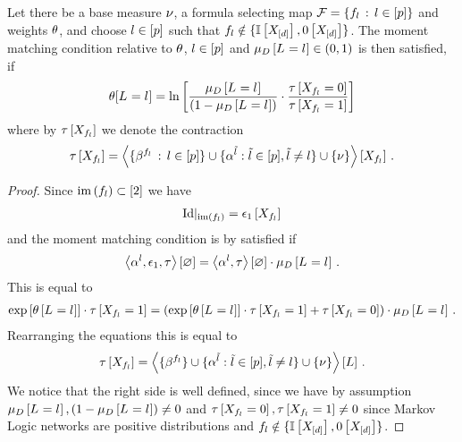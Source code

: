 \begin{lemma}\label{ref:lemMMinMLN}
	Let there be a base measure $\nu$, a formula selecting map $\mathcal{F}=\{f_{l} \, : \, l\in[p]\}$ and weights $\theta$, and choose $l\in[p]$ such that $f_{l}  \notin \{\mathbb{I}\left[X_{[d]}\right],0\left[X_{[d]}\right]\}$.
	The moment matching condition relative to $\theta$, $l\in[p]$ and $\mu_{D}\left[L_{}=l_{}\right]\in(0,1)$ is then satisfied, if
	\begin{align} \label{sol:momentMatchingExformula}
	 	\theta[L_{}=l_{}] = \ln \left[ 
		\frac{\mu_{D}\left[L_{}=l_{}\right]}{(1-\mu_{D}\left[L_{}=l_{}\right])}
		\cdot \frac{\tau\left[X_{f_{l} }=0\right]}{\tau\left[X_{f_{l} }=1\right]}
		 \right]
	\end{align}
	where by $\tau\left[X_{f_{l} }\right]$ we denote the contraction
	\begin{align*}
	 	\tau\left[X_{f_{l}}\right]
		= \left\langle \{\beta^{f_{l}} \, : \, l\in[p]\}
		\cup\{\alpha^{\tilde{l}} : \tilde{l} \in [p], \tilde{l}\neq l\}
		\cup\{\nu\}\right\rangle \left[ X_{f_{l}} \right] \, .
	\end{align*}
\end{lemma}
\begin{proof}
	Since $\mathrm{im}\left(f_{l}\right)\subset[2]$ we have
	\begin{align*}
		{\mathrm{Id}}|_{\mathrm{im}\left(f_{l}\right)} = \epsilon_{1}\left[X_{f_{l}}\right]
	\end{align*}
	and the moment matching condition is by  satisfied if
	\begin{align*}
		\left\langle \alpha^{l}, \epsilon_{1}, \tau\right\rangle \left[ \varnothing \right]
			= \left\langle \alpha^{l},\tau\right\rangle \left[ \varnothing \right] \cdot \mu_{D}\left[L_{}=l_{}\right] \, .
	\end{align*}
	This is equal to
	\begin{align*}
		\mathrm{exp}\left[\theta\left[L_{}=l_{}\right]\right] \cdot \tau\left[X_{f_{l}}=1\right]
		= \left( \mathrm{exp}\left[\theta\left[L_{}=l_{}\right]\right] \cdot \tau\left[X_{f_{l}}=1\right] + \tau\left[X_{f_{l}}=0\right] \right) \cdot \mu_{D}\left[L_{}=l_{}\right] \, .
	\end{align*}
	Rearranging the equations this is equal to
	\begin{align*}
	 	\tau\left[X_{f_{l}}\right]
		= \left\langle \{\beta^{f_{l}}\}
		\cup\{\alpha^{\tilde{l}} : \tilde{l} \in [p], \tilde{l}\neq l\}
		\cup\{\nu\}\right\rangle \left[ L \right] \, .
	\end{align*}
	We notice that the right side is well defined, since we have by assumption $\mu_{D}\left[L_{}=l_{}\right], (1- \mu_{D}\left[L_{}=l_{}\right]) \neq 0$ and $\tau\left[X_{f_{l}}=0\right], \tau\left[X_{f_{l}}=1\right] \neq 0$ since Markov Logic networks are positive distributions and $f_{l} \notin \{\mathbb{I}\left[X_{[d]}\right],0\left[X_{[d]}\right]\}$.
\end{proof}


